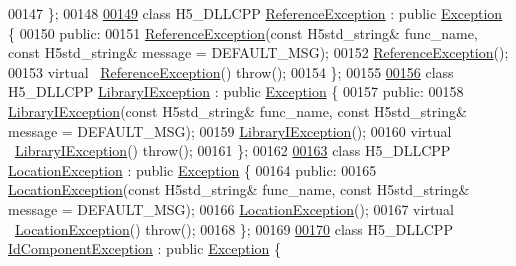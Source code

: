 \begin{DoxyCode}
00147 \};
00148 
\hyperlink{class_h5_1_1_reference_exception}{00149} \textcolor{keyword}{class }H5\_DLLCPP \hyperlink{class_h5_1_1_reference_exception}{ReferenceException} : \textcolor{keyword}{public} \hyperlink{class_h5_1_1_exception}{Exception} \{
00150    \textcolor{keyword}{public}:
00151         \hyperlink{class_h5_1_1_reference_exception}{ReferenceException}(\textcolor{keyword}{const} H5std\_string& func\_name, \textcolor{keyword}{const} H5std\_string& message = 
      DEFAULT\_MSG);
00152         \hyperlink{class_h5_1_1_reference_exception}{ReferenceException}();
00153         \textcolor{keyword}{virtual} ~\hyperlink{class_h5_1_1_reference_exception}{ReferenceException}() \textcolor{keywordflow}{throw}();
00154 \};
00155 
\hyperlink{class_h5_1_1_library_i_exception}{00156} \textcolor{keyword}{class }H5\_DLLCPP \hyperlink{class_h5_1_1_library_i_exception}{LibraryIException} : \textcolor{keyword}{public} \hyperlink{class_h5_1_1_exception}{Exception} \{
00157    \textcolor{keyword}{public}:
00158         \hyperlink{class_h5_1_1_library_i_exception}{LibraryIException}(\textcolor{keyword}{const} H5std\_string& func\_name, \textcolor{keyword}{const} H5std\_string& message = 
      DEFAULT\_MSG);
00159         \hyperlink{class_h5_1_1_library_i_exception}{LibraryIException}();
00160         \textcolor{keyword}{virtual} ~\hyperlink{class_h5_1_1_library_i_exception}{LibraryIException}() \textcolor{keywordflow}{throw}();
00161 \};
00162 
\hyperlink{class_h5_1_1_location_exception}{00163} \textcolor{keyword}{class }H5\_DLLCPP \hyperlink{class_h5_1_1_location_exception}{LocationException} : \textcolor{keyword}{public} \hyperlink{class_h5_1_1_exception}{Exception} \{
00164    \textcolor{keyword}{public}:
00165         \hyperlink{class_h5_1_1_location_exception}{LocationException}(\textcolor{keyword}{const} H5std\_string& func\_name, \textcolor{keyword}{const} H5std\_string& message = 
      DEFAULT\_MSG);
00166         \hyperlink{class_h5_1_1_location_exception}{LocationException}();
00167         \textcolor{keyword}{virtual} ~\hyperlink{class_h5_1_1_location_exception}{LocationException}() \textcolor{keywordflow}{throw}();
00168 \};
00169 
\hyperlink{class_h5_1_1_id_component_exception}{00170} \textcolor{keyword}{class }H5\_DLLCPP \hyperlink{class_h5_1_1_id_component_exception}{IdComponentException} : \textcolor{keyword}{public} \hyperlink{class_h5_1_1_exception}{Exception} \{

\end{DoxyCode}
